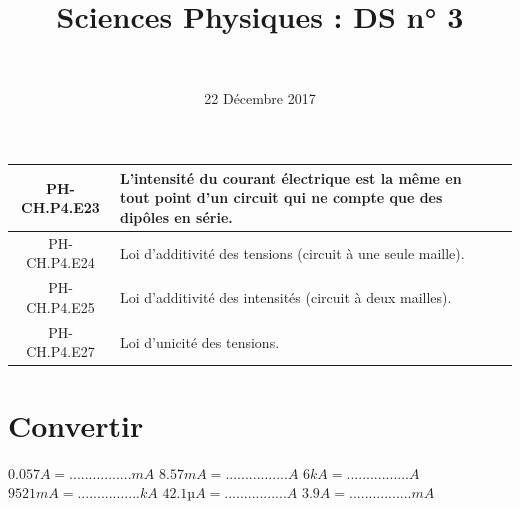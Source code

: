 \documentclass[a4paper,11pt]{exam}
\author{\ }
\date{22 Décembre 2017}
\title{Sciences Physiques : DS n° 3}
\begin{document}
%	

	\maketitle
\vspace*{-0.5cm}	

\begin{scriptsize}
	
\begin{center}
	\begin{tabular}{@{\ }c@{\ }||@{\ }l@{\ }|@{\ $\qquad$}l@{\ }|}
		\hline
		PH-CH.P4.E23 & L’intensité du courant électrique est la même en tout point d’un circuit qui ne compte que des dipôles en série. &  \\
		\hline
		PH-CH.P4.E24 & Loi d’additivité des tensions (circuit à une seule maille). &  \\
		\hline
		PH-CH.P4.E25 & Loi d’additivité des intensités (circuit à deux mailles). &  \\
		\hline
		PH-CH.P4.E27 & Loi d’unicité des tensions. &  \\
		\hline
	\end{tabular}
\end{center}

\end{scriptsize}

%

\section{Convertir}

\begin{questions}
	\begin{multicols}{3}
		
	\question $\num{0.057} A = ................ mA$
	\question $\num{8.57} mA = ................ A$
	\question $\num{6} kA = ................ A$
	\question $\num{9521} mA = ................ kA$
	\question $\num{42.1} µA = ................ A$
	\question $\num{3.9} A = ................ mA$
	
	\end{multicols}
	
\end{questions}



\newpage 

%


\end{document}
